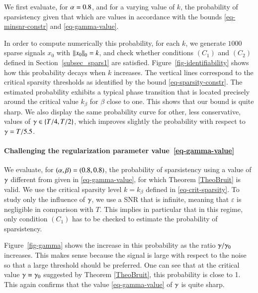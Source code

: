 We first evaluate, for $\alpha=0.8$, and for a varying value of $k$, the probability of sparsistency given that 
which are values in accordance with the bounds \eqref{eq-minsnr-constr} and \eqref{eq-gamma-value}.

In order to compute numerically this probability, for each $k$, we generate $1000$ sparse signals $x_0$ with $\left\Vert{x_0}\right\Vert_{0}=k$, and check whether conditions $(C_1)$ and $(C_2)$ defined in Section~\ref{subsec_spars1} are satisfied. Figure~\ref{fig-identifiability} shows how this probability decays when $k$ increases. The vertical lines correspond to the critical sparsity thresholds
as identified by the bound \eqref{eq-sparsity-constr}. The estimated probability exhibits a typical phase transition that is located precisely around the critical value $k_\beta$ for $\beta$ close to one. This shows that our bound is quite sharp. We also display the same probability curve for other, less conservative, values of $\gamma \in \{T/4, T/2\}$, which improves slightly the probability with respect to $\gamma = T/5.5$.



\paragraph{Challenging the regularization parameter value~\eqref{eq-gamma-value}}

We evaluate, for $(\alpha,\beta) = (0.8,0.8)$, the probability of sparsistency using a value of $\gamma$ different from 
given in \eqref{eq-gamma-value}, for which Theorem \ref{TheoBruit} is valid. 
We use the critical sparsity level $k=k_\beta$ defined in \eqref{eq-crit-sparsity}.
To study only the influence of $\gamma$, we use a SNR that is infinite, meaning that $\varepsilon$ is negligible in comparison with $T$. This implies in particular that in this regime, only condition $(C_1)$ has to be checked to estimate the probability of sparsistency.

Figure~\ref{fig-gamma} shows the increase in this probability as the ratio $\gamma/\gamma_0$ increases. This makes sense because the signal is large with respect to the noise so that a large threshold should be preferred. One can see that at the critical value $\gamma=\gamma_0$ suggested by Theorem \ref{TheoBruit}, this probability is close to 1. This again confirms that the value \eqref{eq-gamma-value} of $\gamma$ is quite sharp.

